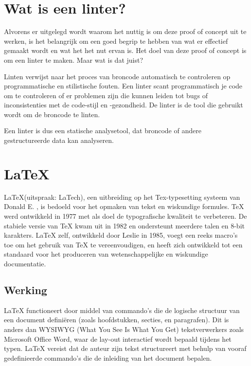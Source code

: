 \section{Wat is een linter?}
Alvorens er uitgelegd wordt waarom het nuttig is om deze proof of concept uit te werken, is het belangrijk om een goed begrip te hebben van wat er effectief gemaakt wordt en wat het het nut ervan is. Het doel van deze proof of concept is om een linter te maken. Maar wat is dat juist?

Linten verwijst naar het proces van broncode automatisch te controleren op programmatische en stilistische fouten. Een linter scant programmatisch je code om te controleren of er problemen zijn die kunnen leiden tot bugs of inconsistenties met de code-stijl en -gezondheid. De linter is de tool die gebruikt wordt om de broncode te linten. \autocite{Kamunya2023}

Een linter is dus een statische analysetool, dat broncode of andere gestructureerde data kan analyseren.

\section{\LaTeX}
\LaTeX (uitspraak: LaTech), een uitbreiding op het Tex-typesetting systeem van Donald E. \textcite{Knuth1984}, is bedoeld voor het opmaken van tekst en wiskundige formules. TeX werd ontwikkeld in 1977 met als doel de typografische kwaliteit te verbeteren. De stabiele versie van TeX kwam uit in 1982 en ondersteunt meerdere talen en 8-bit karakters. LaTeX zelf, ontwikkeld door Leslie \textcite{Lamport1994} in 1985, voegt een reeks macro's toe om het gebruik van TeX te vereenvoudigen, en heeft zich ontwikkeld tot een standaard voor het produceren van wetenschappelijke en wiskundige documentatie. \autocite{Oetiker2023}

\subsection{Werking}
LaTeX functioneert door middel van commando's die de logische structuur van een document definiëren (zoals hoofdstukken, secties, en paragrafen). Dit is anders dan WYSIWYG (What You See Is What You Get) tekstverwerkers zoals Microsoft Office Word, waar de lay-out interactief wordt bepaald tijdens het typen. LaTeX vereist dat de auteur zijn tekst structureert met behulp van vooraf gedefinieerde commando's die de inleiding van het document bepalen. \autocite{Oetiker2023}

